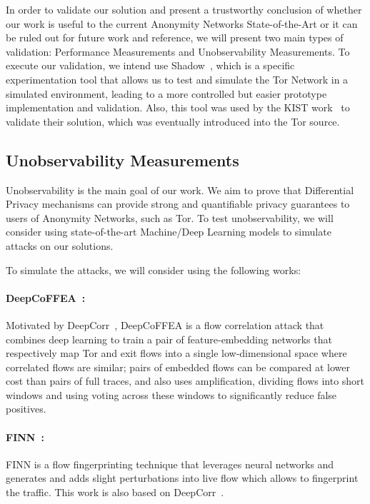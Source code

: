 In order to validate our solution and present a trustworthy conclusion of whether our work is useful to the current Anonymity Networks State-of-the-Art or it can be ruled out for future work and reference, we will present two main types of validation: Performance Measurements and Unobservability Measurements. To execute our validation, we intend use Shadow~\cite*{Shadow, Shadow2}, which is a specific experimentation tool that allows us to test and simulate the Tor Network in a simulated environment, leading to a more controlled but easier prototype implementation and validation. Also, this tool was used by the KIST work~\cite{KIST} to validate their solution, which was eventually introduced into the Tor source. 

\subsection{Unobservability Measurements}\label{subsec:unobservability_measurements}

Unobservability is the main goal of our work. We aim to prove that Differential Privacy mechanisms can provide strong and quantifiable privacy guarantees to users of Anonymity Networks, such as Tor. To test unobservability, we will consider using state-of-the-art Machine/Deep Learning models to simulate attacks on our solutions.

To simulate the attacks, we will consider using the following works:
\paragraph{DeepCoFFEA~\cite{DeepCoFFEA}:} Motivated by DeepCorr~\cite{DeepCorr}, DeepCoFFEA is a flow correlation attack that combines deep learning to train a pair of feature-embedding networks that respectively map Tor and exit flows into a single low-dimensional space where correlated flows are similar; pairs of embedded flows can be compared at lower cost than pairs of full traces, and also uses amplification, dividing flows into short windows and using voting across these windows to significantly reduce false positives.

\paragraph{FINN~\cite{FINN}:} FINN is a flow fingerprinting technique that leverages neural networks and generates and adds slight perturbations into live flow which allows to fingerprint the traffic. This work is also based on DeepCorr~\cite{DeepCorr}.

